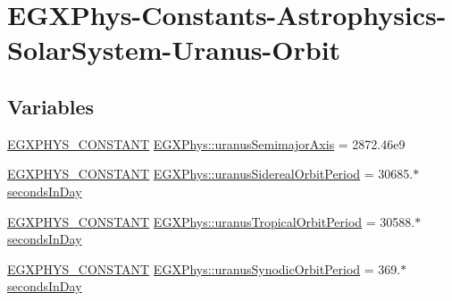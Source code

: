 \hypertarget{group___e_g_x_phys-_constants-_astrophysics-_solar_system-_uranus-_orbit}{}\section{E\+G\+X\+Phys-\/\+Constants-\/\+Astrophysics-\/\+Solar\+System-\/\+Uranus-\/\+Orbit}
\label{group___e_g_x_phys-_constants-_astrophysics-_solar_system-_uranus-_orbit}
\subsection*{Variables}
\begin{DoxyCompactItemize}
\item 
\mbox{\hyperlink{group___e_g_x_phys-_constants-_macros_ga76980d288494ce1714c9ac68a95ba702}{E\+G\+X\+P\+H\+Y\+S\+\_\+\+C\+O\+N\+S\+T\+A\+NT}} \mbox{\hyperlink{group___e_g_x_phys-_constants-_astrophysics-_solar_system-_uranus-_orbit_ga34dc0986eab0b7450cf80dc5b17cd892}{E\+G\+X\+Phys\+::uranus\+Semimajor\+Axis}} = 2872.\+46e9
\item 
\mbox{\hyperlink{group___e_g_x_phys-_constants-_macros_ga76980d288494ce1714c9ac68a95ba702}{E\+G\+X\+P\+H\+Y\+S\+\_\+\+C\+O\+N\+S\+T\+A\+NT}} \mbox{\hyperlink{group___e_g_x_phys-_constants-_astrophysics-_solar_system-_uranus-_orbit_gaf2077b1c1b606d34f14b5d23ca2c160a}{E\+G\+X\+Phys\+::uranus\+Sidereal\+Orbit\+Period}} = 30685.$\ast$\mbox{\hyperlink{namespace_e_g_x_phys_a93d2a00d75411b58cbf63ab3fd1f8bc2}{seconds\+In\+Day}}
\item 
\mbox{\hyperlink{group___e_g_x_phys-_constants-_macros_ga76980d288494ce1714c9ac68a95ba702}{E\+G\+X\+P\+H\+Y\+S\+\_\+\+C\+O\+N\+S\+T\+A\+NT}} \mbox{\hyperlink{group___e_g_x_phys-_constants-_astrophysics-_solar_system-_uranus-_orbit_gaafe74005ae724e813166abbefc7a4458}{E\+G\+X\+Phys\+::uranus\+Tropical\+Orbit\+Period}} = 30588.$\ast$\mbox{\hyperlink{namespace_e_g_x_phys_a93d2a00d75411b58cbf63ab3fd1f8bc2}{seconds\+In\+Day}}
\item 
\mbox{\hyperlink{group___e_g_x_phys-_constants-_macros_ga76980d288494ce1714c9ac68a95ba702}{E\+G\+X\+P\+H\+Y\+S\+\_\+\+C\+O\+N\+S\+T\+A\+NT}} \mbox{\hyperlink{group___e_g_x_phys-_constants-_astrophysics-_solar_system-_uranus-_orbit_gaddf14c8c085286e28628dbdd11378081}{E\+G\+X\+Phys\+::uranus\+Synodic\+Orbit\+Period}} = 369.$\ast$\mbox{\hyperlink{namespace_e_g_x_phys_a93d2a00d75411b58cbf63ab3fd1f8bc2}{seconds\+In\+Day}}

\end{DoxyCompactItemize}
